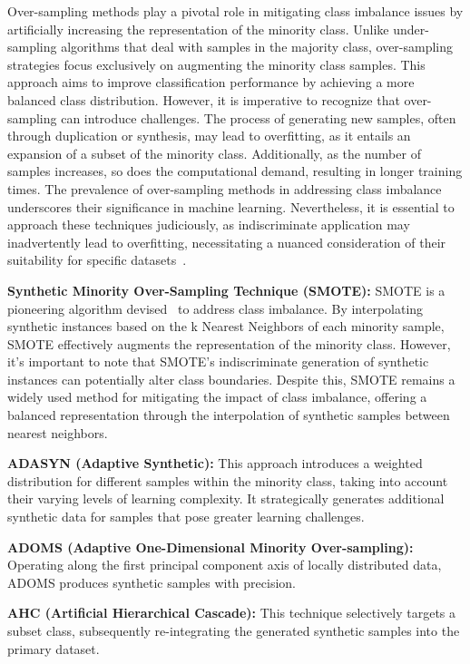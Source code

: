 Over-sampling methods play a pivotal role in mitigating class imbalance issues by artificially increasing the representation of the minority class. Unlike under-sampling algorithms that deal with samples in the majority class, over-sampling strategies focus exclusively on augmenting the minority class samples. This approach aims to improve classification performance by achieving a more balanced class distribution. However, it is imperative to recognize that over-sampling can introduce challenges. The process of generating new samples, often through duplication or synthesis, may lead to overfitting, as it entails an expansion of a subset of the minority class. Additionally, as the number of samples increases, so does the computational demand, resulting in longer training times. The prevalence of over-sampling methods in addressing class imbalance underscores their significance in machine learning. Nevertheless, it is essential to approach these techniques judiciously, as indiscriminate application may inadvertently lead to overfitting, necessitating a nuanced consideration of their suitability for specific datasets~\cite{Khushi2021,Tarawneh2022,Xu2020,Liu2022}.

\textbf{Synthetic Minority Over-Sampling Technique (SMOTE):} SMOTE is a pioneering algorithm devised~\cite{Chawla2002} to address class imbalance. By interpolating synthetic instances based on the k Nearest Neighbors of each minority sample, SMOTE effectively augments the representation of the minority class. However, it's important to note that SMOTE's indiscriminate generation of synthetic instances can potentially alter class boundaries. Despite this, SMOTE remains a widely used method for mitigating the impact of class imbalance, offering a balanced representation through the interpolation of synthetic samples between nearest neighbors.

\textbf{ADASYN (Adaptive Synthetic):} This approach introduces a weighted distribution for different samples within the minority class, taking into account their varying levels of learning complexity. It strategically generates additional synthetic data for samples that pose greater learning challenges.

\textbf{ADOMS (Adaptive One-Dimensional Minority Over-sampling):} Operating along the first principal component axis of locally distributed data, ADOMS produces synthetic samples with precision.

\textbf{AHC (Artificial Hierarchical Cascade):} This technique selectively targets a subset class, subsequently re-integrating the generated synthetic samples into the primary dataset.

